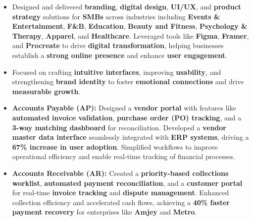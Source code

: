 \documentclass[10pt,a4paper,ragged2e,withhyper]{altacv}
\begin{document}
\begin{paracol}{2}


\begin{itemize}
  \item Designed and delivered \textbf{branding}, \textbf{digital design}, \textbf{UI/UX}, and \textbf{product strategy} solutions for \textbf{SMBs} across industries including \textbf{Events \& Entertainment}, \textbf{F\&B}, \textbf{Education}, \textbf{Beauty and Fitness}, \textbf{Psychology \& Therapy}, \textbf{Apparel}, and \textbf{Healthcare}. Leveraged tools like \textbf{Figma}, \textbf{Framer}, and \textbf{Procreate} to drive \textbf{digital transformation}, helping businesses establish a \textbf{strong online presence} and enhance \textbf{user engagement}.

  \item Focused on crafting \textbf{intuitive interfaces}, improving \textbf{usability}, and strengthening \textbf{brand identity} to foster \textbf{emotional connections} and drive \textbf{measurable growth}.
\end{itemize}

\divider


\begin{itemize}
    \item \textbf{Accounts Payable (AP):} Designed a \textbf{vendor portal} with features like \textbf{automated invoice validation}, \textbf{purchase order (PO) tracking}, and a \textbf{3-way matching dashboard} for reconciliation. Developed a \textbf{vendor master data interface} seamlessly integrated with \textbf{ERP systems}, driving a \textbf{67\% increase in user adoption}. Simplified workflows to improve operational efficiency and enable real-time tracking of financial processes.
    
    \item \textbf{Accounts Receivable (AR):} Created a \textbf{priority-based collections worklist}, \textbf{automated payment reconciliation}, and a \textbf{customer portal} for real-time \textbf{invoice tracking} and \textbf{dispute management}. Enhanced collection efficiency and accelerated cash flows, achieving a \textbf{40\% faster payment recovery} for enterprises like \textbf{Amjey} and \textbf{Metro}.
    

\end{itemize}
\end{paracol}
\end{document}
